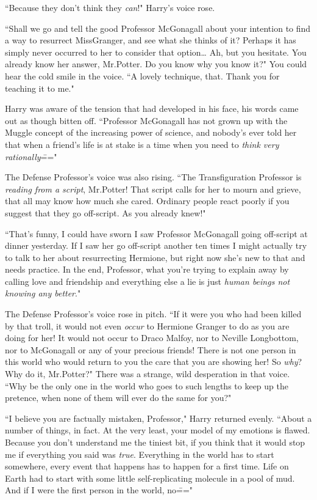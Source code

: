 ``Because they don't think they \emph{can}!" Harry's voice rose.

``Shall we go and tell the good Professor McGonagall about your intention to find a way to resurrect Miss\?Granger, and see what she thinks of it? Perhaps it has simply never occurred to her to consider that option{\ldots} Ah, but you hesitate. You already know her answer, Mr.\?Potter. Do you know why you know it?" You could hear the cold smile in the voice. ``A lovely technique, that. Thank you for teaching it to me."

Harry was aware of the tension that had developed in his face, his words came out as though bitten off. ``Professor McGonagall has not grown up with the Muggle concept of the increasing power of science, and nobody's ever told her that when a friend's life is at stake is a time when you need to \emph{think very rationally}\==="

The Defense Professor's voice was also rising. ``The Transfiguration Professor is \emph{reading from a script}, Mr.\?Potter! That script calls for her to mourn and grieve, that all may know how much she cared. Ordinary people react poorly if you suggest that they go off-script. As you already knew!"

``That's funny, I could have sworn I saw Professor McGonagall going off-script at dinner yesterday. If I saw her go off-script another ten times I might actually try to talk to her about resurrecting Hermione, but right now she's new to that and needs practice. In the end, Professor, what you're trying to explain away by calling love and friendship and everything else a lie is just \emph{human beings not knowing any better}."

The Defense Professor's voice rose in pitch. ``If it were you who had been killed by that troll, it would not even \emph{occur} to Hermione Granger to do as you are doing for her! It would not occur to Draco Malfoy, nor to Neville Longbottom, nor to McGonagall or any of your precious friends! There is not one person in this world who would return to you the care that you are showing her! So \emph{why}? Why do it, Mr.\?Potter?" There was a strange, wild desperation in that voice. ``Why be the only one in the world who goes to such lengths to keep up the pretence, when none of them will ever do the same for you?"

``I believe you are factually mistaken, Professor," Harry returned evenly. ``About a number of things, in fact. At the very least, your model of my emotions is flawed. Because you don't understand me the tiniest bit, if you think that it would stop me if everything you said was \emph{true}. Everything in the world has to start somewhere, every event that happens has to happen for a first time. Life on Earth had to start with some little self-replicating molecule in a pool of mud. And if I were the first person in the world, no\==="

